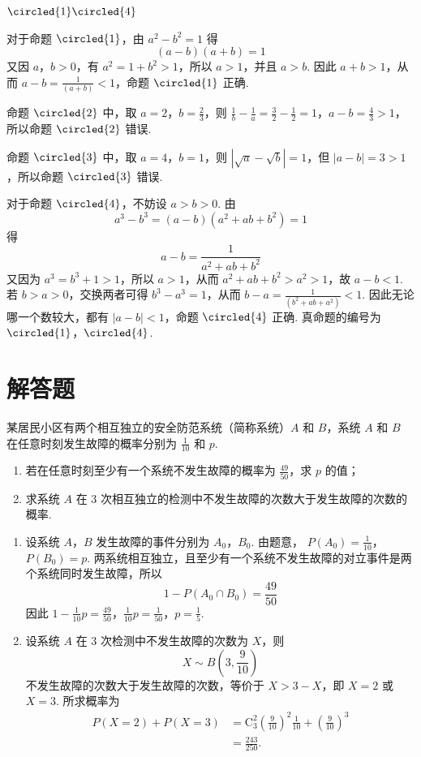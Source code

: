 \begin{answer}
\(\circled{1}\circled{4}\)
\end{answer}

\begin{solution}
对于命题 \(\circled{1}\)，由 \(a^2-b^2=1\) 得
\[
(a-b)(a+b)=1
\]
又因 \(a\)，\(b>0\)，有 \(a^2=1+b^2>1\)，所以 \(a>1\)，并且 \(a>b\). 因此 \(a+b>1\)，从而 \(a-b=\frac{1}{(a+b)}<1\)，命题 \(\circled{1}\) 正确.

命题 \(\circled{2}\) 中，取 \(a=2\)，\(b=\frac23\)，则
\(\frac1b-\frac1a=\frac32-\frac12=1\)，\(a-b=\frac43>1\)，
所以命题 \(\circled{2}\) 错误.

命题 \(\circled{3}\) 中，取 \(a=4\)，\(b=1\)，则 \(|\sqrt a-\sqrt b|=1\)，但 \(|a-b|=3>1\)，所以命题 \(\circled{3}\) 错误.

对于命题 \(\circled{4}\)，不妨设 \(a>b>0\). 由
\[
a^3-b^3=(a-b)(a^2+ab+b^2)=1
\]
得
\[
a-b=\frac1{a^2+ab+b^2}
\]
又因为 \(a^3=b^3+1>1\)，所以 \(a>1\)，从而 \(a^2+ab+b^2>a^2>1\)，故
\(a-b<1\). 若 \(b>a>0\)，交换两者可得
\(b^3-a^3=1\)，从而
\(b-a=\frac{1}{(b^2+ab+a^2)}<1\). 因此无论哪一个数较大，都有
\(|a-b|<1\)，命题 \(\circled{4}\) 正确. 真命题的编号为 \(\circled{1}\)，\(\circled{4}\).
\end{solution}

\section{解答题}

\begin{problem}
某居民小区有两个相互独立的安全防范系统（简称系统）\(A\) 和 \(B\)，系统 \(A\) 和 \(B\) 在任意时刻发生故障的概率分别为 \( \frac{1}{10} \) 和 \(p\).
\begin{enumerate}
\item 若在任意时刻至少有一个系统不发生故障的概率为 \(\frac{49}{50}\)，求 \(p\) 的值；
\item 求系统 \(A\) 在 3 次相互独立的检测中不发生故障的次数大于发生故障的次数的概率.
\end{enumerate}
\end{problem}

\begin{solution}
\begin{enumerate}
\item 设系统 \(A\)，\(B\) 发生故障的事件分别为 \(A_0\)，\(B_0\). 由题意，
\(P(A_0)=\frac1{10}\)，\(P(B_0)=p\).
两系统相互独立，且至少有一个系统不发生故障的对立事件是两个系统同时发生故障，所以
\[
1-P(A_0\cap B_0)=\frac{49}{50}
\]
因此
\(1-\frac1{10}p=\frac{49}{50}\)，\(\frac1{10}p=\frac1{50}\)，\(p=\frac15\).
\item 设系统 \(A\) 在 3 次检测中不发生故障的次数为 \(X\)，则
\[
X\sim B\left(3,\frac9{10}\right)
\]
不发生故障的次数大于发生故障的次数，等价于 \(X>3-X\)，即 \(X=2\) 或 \(X=3\). 所求概率为
\[
\begin{aligned}
P(X=2)+P(X=3)
&=\mathrm C_3^2\left(\frac9{10}\right)^2\frac1{10}+\left(\frac9{10}\right)^3\\
&=\frac{243}{250}.
\end{aligned}
\]
\end{enumerate}
\end{solution}


